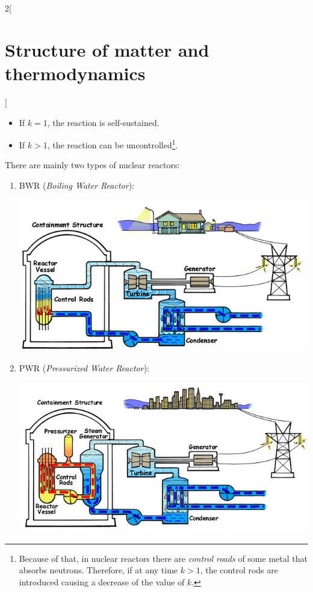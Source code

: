 \documentclass[../../../main.tex]{subfiles}
\begin{document}
\begin{multicols}{2}[\section{Structure of matter and thermodynamics}]
\begin{definition}
\begin{itemize}
      \item If $k=1$, the reaction is self-sustained.
      \item If $k>1$, the reaction can be uncontrolled\footnote{Because of that, in nuclear reactors there are \emph{control roads} of some metal that absorbs neutrons. Therefore, if at any time $k>1$, the control rods are introduced causing a decrease of the value of $k$.}.
    \end{itemize}
  \end{definition}
  \begin{definition}
    There are mainly two types of nuclear reactors:
    \begin{enumerate}
      \item BWR (\emph{Boiling Water Reactor}):
            \begin{center}
              \begin{minipage}{\linewidth}
                \centering
                \includegraphics[width=\linewidth]{Images/bwr.jpg}
              \end{minipage}
            \end{center}
      \item PWR (\emph{Pressurized Water Reactor}):
            \begin{center}
              \begin{minipage}{\linewidth}
                \centering
                \includegraphics[width=\linewidth]{Images/pwr.jpg}

\end{minipage}
\end{center}
\end{enumerate}
\end{definition}
\end{multicols}
\end{document}
